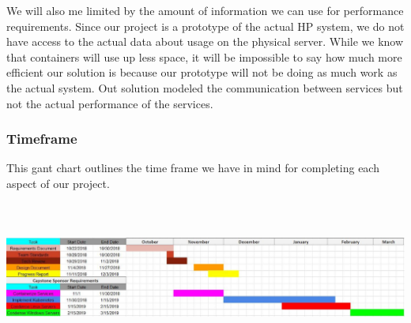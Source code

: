 \documentclass[onecolumn, draftclsnofoot,10pt, compsoc]{IEEEtran}
\begin{document}
We will also me limited by the amount of information we can use for performance requirements.
Since our project is a prototype of the actual HP system, we do not have access to the actual data about usage on the physical server.
While we know that containers will use up less space, it will be impossible to say how much more efficient our solution is because our prototype will not be doing as much work as the actual system.
Out solution modeled the communication between services but not the actual performance of the services.

%

\subsubsection{Timeframe}

This gant chart outlines the time frame we have in mind for completing each aspect of our project.
\begin{center}
    \includegraphics[width=\textwidth, height=5cm]{gant.eps}
\end{center}
\end{document}

